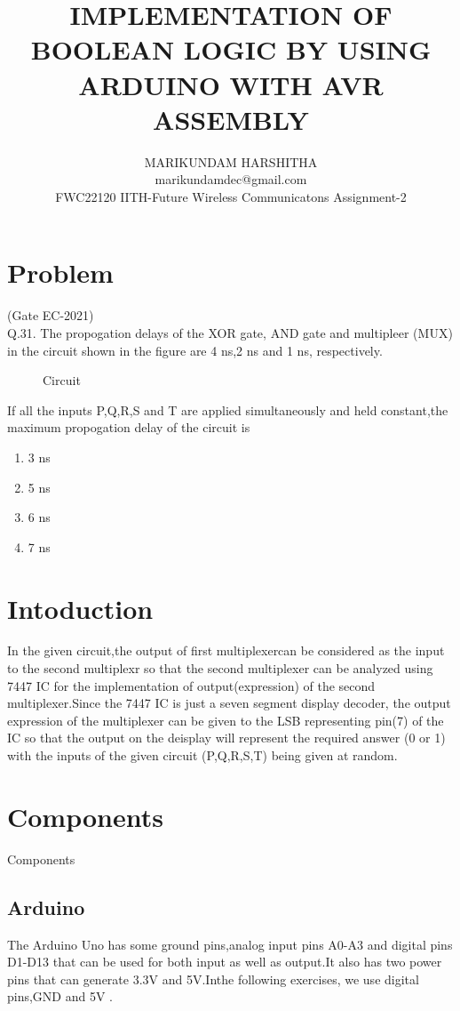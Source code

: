 \documentclass{article}
\title{IMPLEMENTATION OF BOOLEAN LOGIC BY USING ARDUINO WITH AVR ASSEMBLY}
\author{MARIKUNDAM HARSHITHA\\marikundamdec@gmail.com\\FWC22120 IITH-Future Wireless Communicatons  Assignment-2}
\date{}
\begin{document}
\maketitle
\tableofcontents

\section{Problem}
		(Gate EC-2021)\\
Q.31. The propogation delays of the XOR gate, AND gate and multipleer (MUX) in the circuit shown in the figure are 4 ns,2 ns and 1 ns, respectively.\\
\begin{figure}[!h]
\begin{center}
\resizebox{0.5\columnwidth}{!}{

}
\end{center}
\caption{Circuit}
\label{fig:circuit}
\end{figure}
If all the inputs P,Q,R,S and T are applied simultaneously and held constant,the maximum propogation delay of the circuit is 
\begin{enumerate}
	\item 3 ns \item 5 ns \item 6 ns \item 7 ns
\end{enumerate}
\section{Intoduction}
	In the given circuit,the output of first multiplexercan be considered as the input to the second multiplexr so that the second multiplexer can be analyzed using 7447 IC for the implementation of output(expression) of the second multiplexer.Since the 7447 IC is just a seven segment display decoder, the output expression of the multiplexer can be given to the LSB representing pin(7) of the IC so that the output on the deisplay will represent the required answer (0 or 1) with the inputs of the given circuit (P,Q,R,S,T) being given at random.
\section{Components}
\begin{table}[!h]
\centering

\caption{Components}
\label{table:Components}
\end{table}
\subsection{Arduino} 
The Arduino Uno has some ground pins,analog input pins A0-A3 and digital pins D1-D13 that can be used for both input as well as output.It also has two power pins that can generate 3.3V and 5V.Inthe following exercises, we use digital pins,GND and 5V .
\end{document}
